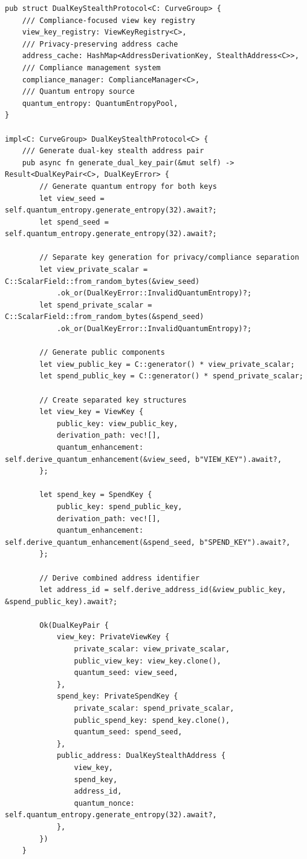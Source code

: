 \documentclass[12pt,a4paper]{article}
\begin{document}
\begin{lstlisting}[style=rustcode, caption=Dual-Key Stealth Address Protocol]
pub struct DualKeyStealthProtocol<C: CurveGroup> {
    /// Compliance-focused view key registry
    view_key_registry: ViewKeyRegistry<C>,
    /// Privacy-preserving address cache
    address_cache: HashMap<AddressDerivationKey, StealthAddress<C>>,
    /// Compliance management system
    compliance_manager: ComplianceManager<C>,
    /// Quantum entropy source
    quantum_entropy: QuantumEntropyPool,
}

impl<C: CurveGroup> DualKeyStealthProtocol<C> {
    /// Generate dual-key stealth address pair
    pub async fn generate_dual_key_pair(&mut self) -> Result<DualKeyPair<C>, DualKeyError> {
        // Generate quantum entropy for both keys
        let view_seed = self.quantum_entropy.generate_entropy(32).await?;
        let spend_seed = self.quantum_entropy.generate_entropy(32).await?;
        
        // Separate key generation for privacy/compliance separation
        let view_private_scalar = C::ScalarField::from_random_bytes(&view_seed)
            .ok_or(DualKeyError::InvalidQuantumEntropy)?;
        let spend_private_scalar = C::ScalarField::from_random_bytes(&spend_seed)
            .ok_or(DualKeyError::InvalidQuantumEntropy)?;
            
        // Generate public components
        let view_public_key = C::generator() * view_private_scalar;
        let spend_public_key = C::generator() * spend_private_scalar;
        
        // Create separated key structures
        let view_key = ViewKey {
            public_key: view_public_key,
            derivation_path: vec![],
            quantum_enhancement: self.derive_quantum_enhancement(&view_seed, b"VIEW_KEY").await?,
        };
        
        let spend_key = SpendKey {
            public_key: spend_public_key,
            derivation_path: vec![],
            quantum_enhancement: self.derive_quantum_enhancement(&spend_seed, b"SPEND_KEY").await?,
        };
        
        // Derive combined address identifier
        let address_id = self.derive_address_id(&view_public_key, &spend_public_key).await?;
        
        Ok(DualKeyPair {
            view_key: PrivateViewKey {
                private_scalar: view_private_scalar,
                public_view_key: view_key.clone(),
                quantum_seed: view_seed,
            },
            spend_key: PrivateSpendKey {
                private_scalar: spend_private_scalar,
                public_spend_key: spend_key.clone(),
                quantum_seed: spend_seed,
            },
            public_address: DualKeyStealthAddress {
                view_key,
                spend_key,
                address_id,
                quantum_nonce: self.quantum_entropy.generate_entropy(32).await?,
            },
        })
    }
    

\end{lstlisting}
\end{document}
